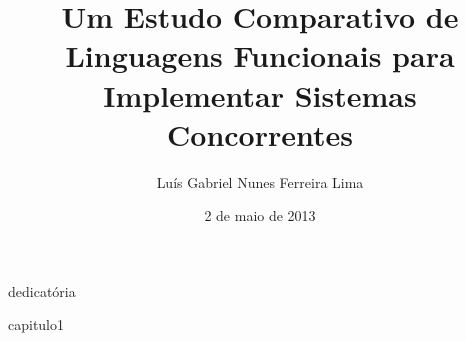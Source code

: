 \documentclass[bsc,oneside]{ufpethesis/ufpethesis}
\title{Um Estudo Comparativo de Linguagens Funcionais para Implementar Sistemas Concorrentes}
\author{Luís Gabriel Nunes Ferreira Lima}
\date{2 de maio de 2013}
\institute{Centro de Informática}
\begin{document}
\frontmatter

\frontpage

\presentationpage

\begin{dedicatory}
dedicatória
\end{dedicatory}

\acknowledgements


\resumo


\abstract


\tableofcontents

\mainmatter

 {capitulo1}


\backmatter

\nocite{*}


\end{document}
